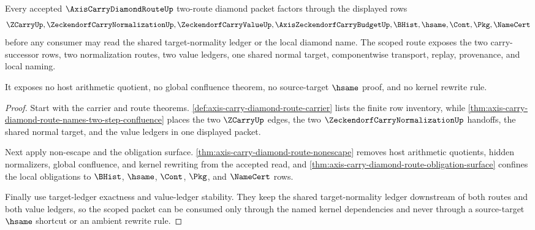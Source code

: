 \begin{theorem}
\label{thm:axis-carry-diamond-route-scoped-kernel-dependencies}
Every accepted $\AxisCarryDiamondRouteUp$ two-route diamond packet factors through the displayed rows
$$
\ZCarryUp,\ZeckendorfCarryNormalizationUp,\ZeckendorfCarryValueUp,\AxisZeckendorfCarryBudgetUp,\BHist,\hsame,\Cont,\Pkg,\NameCert
$$
before any consumer may read the shared target-normality ledger or the local diamond name. The scoped route exposes the two carry-successor rows, two normalization routes, two value ledgers, one shared normal target, componentwise transport, replay, provenance, and local naming.

It exposes no host arithmetic quotient, no global confluence theorem, no source-target $\hsame$ proof, and no kernel rewrite rule.
\end{theorem}
\begin{proof}
Start with the carrier and route theorems. \autoref{def:axis-carry-diamond-route-carrier} lists the finite row inventory, while \autoref{thm:axis-carry-diamond-route-names-two-step-confluence} places the two $\ZCarryUp$ edges, the two $\ZeckendorfCarryNormalizationUp$ handoffs, the shared normal target, and the value ledgers in one displayed packet.

Next apply non-escape and the obligation surface. \autoref{thm:axis-carry-diamond-route-nonescape} removes host arithmetic quotients, hidden normalizers, global confluence, and kernel rewriting from the accepted read, and \autoref{thm:axis-carry-diamond-route-obligation-surface} confines the local obligations to $\BHist$, $\hsame$, $\Cont$, $\Pkg$, and $\NameCert$ rows.

Finally use target-ledger exactness and value-ledger stability. They keep the shared target-normality ledger downstream of both routes and both value ledgers, so the scoped packet can be consumed only through the named kernel dependencies and never through a source-target $\hsame$ shortcut or an ambient rewrite rule.
\end{proof}


